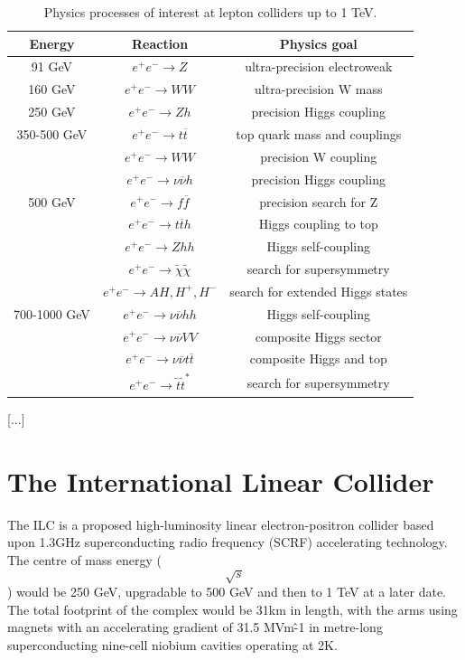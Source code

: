 \begin{table}[h]
\centering
	\begin{tabular}{ c | c | c }
	\hline \hline
	\textbf{Energy} & \textbf{Reaction} & \textbf{Physics goal} \\ \hline
	 91 GeV & $e^+ e^- \rightarrow Z$ & ultra-precision electroweak \\ \hline
	 160 GeV & $e^+ e^- \rightarrow WW$ & ultra-precision W mass \\ \hline
	 250 GeV & $e^+ e^- \rightarrow Zh$ & precision Higgs coupling \\ \hline
	 350-500 GeV & $e^+ e^- \rightarrow t\overline{t}$ & top quark mass and couplings \\
	   & $e^+ e^- \rightarrow WW$ & precision W coupling \\
	   & $e^+ e^- \rightarrow \nu \overline{\nu} h$ & precision Higgs coupling \\ \hline
	 500 GeV & $e^+ e^- \rightarrow f \overline{f}$ & precision search for Z\prime \\
	   & $e^+ e^- \rightarrow t \overline{t}h$ & Higgs coupling to top \\
	   & $e^+ e^- \rightarrow Zhh$ & Higgs self-coupling \\
	   & $e^+ e^- \rightarrow \widetilde{\chi} \widetilde{\chi}$ & search for supersymmetry \\
	   & $e^+ e^- \rightarrow AH, H^+, H^-$ & search for extended Higgs states \\ \hline
	 700-1000 GeV & $e^+ e^- \rightarrow \nu \overline{\nu} hh$ & Higgs self-coupling \\
	   & $e^+ e^- \rightarrow \nu \overline{\nu} VV$ & composite Higgs sector \\
	   & $e^+ e^- \rightarrow  \nu \overline{\nu} t \overline{t}$ & composite Higgs and top \\
	   & $e^+ e^- \rightarrow \tilde{t} \tilde{t}^*$ & search for supersymmetry \\ \hline
	\end{tabular}
	\caption{Physics processes of interest at lepton colliders up to 1 TeV.}
	\label{table:colliders/physics-goals}
\end{table}

[...]

\section{The International Linear Collider}
The \acrfull{ILC} is a proposed high-luminosity linear electron-positron collider based upon 1.3GHz superconducting radio frequency (SCRF) accelerating technology. The centre of mass energy ($$\sqrt{s}$$) would be 250 GeV, upgradable to 500 GeV and then to 1 TeV at a later date. The total footprint of the complex would be 31km in length, with the arms using magnets with an accelerating gradient of 31.5 MVm\^{-1} in metre-long superconducting nine-cell niobium cavities operating at 2K.

